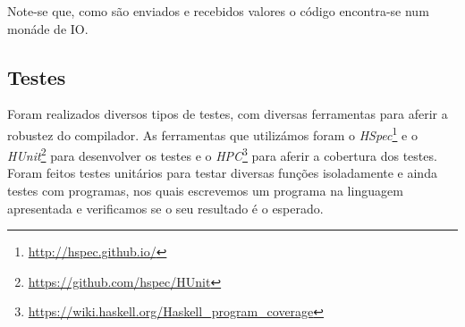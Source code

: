 Note-se que, como são enviados e recebidos valores o código encontra-se num monáde de IO. 


\subsection{Testes}

Foram realizados diversos tipos de testes, com diversas ferramentas para aferir a robustez do compilador. As ferramentas que utilizámos foram o \textit{HSpec}\footnote{\url{http://hspec.github.io/}} e o \textit{HUnit}\footnote{\url{https://github.com/hspec/HUnit}} para desenvolver os testes e o \textit{HPC}\footnote{\url{https://wiki.haskell.org/Haskell_program_coverage}} para aferir a cobertura dos testes. Foram feitos testes unitários para testar diversas funções isoladamente e ainda testes com programas, nos quais escrevemos um programa na linguagem apresentada e verificamos se o seu resultado é o esperado.



